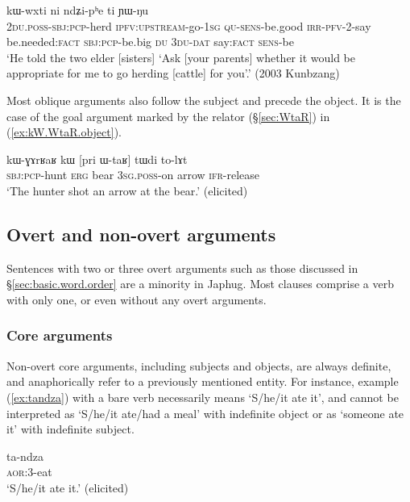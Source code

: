 \begin{exe}
\ex \label{ex:O.ndZiphe}
\gll [nɯ-kɯ-lɤɣ lu-ɕe-a ɯ-ɲɯ́-pe a-tɤ-tɯ-ti ra] kɯ-wxti ni ndʑi-pʰe ti ɲɯ-ŋu\\
\textsc{2du}.\textsc{poss}-\textsc{sbj}:\textsc{pcp}-herd \textsc{ipfv}:\textsc{upstream}-go-\textsc{1sg} \textsc{qu}-\textsc{sens}-be.good \textsc{irr}-\textsc{pfv}-2-say be.needed:\textsc{fact}  \textsc{sbj}:\textsc{pcp}-be.big \textsc{du} \textsc{3du}-\textsc{dat} say:\textsc{fact} \textsc{sens}-be\\
\glt `He told the two elder [sisters] `Ask [your parents] whether it would be appropriate for me to go herding [cattle] for you'.' (2003 Kunbzang)
\end{exe}

Most oblique arguments also follow the subject and precede the object. It is the case of the goal argument marked by the relator  (§\ref{sec:WtaR}) in (\ref{ex:kW.WtaR.object}).

\begin{exe}
\ex \label{ex:kW.WtaR.object}
\gll  kɯ-ɣɤrʁaʁ kɯ [pri ɯ-taʁ] tɯdi to-lɤt \\
\textsc{sbj}:\textsc{pcp}-hunt \textsc{erg} bear \textsc{3sg}.\textsc{poss}-on arrow \textsc{ifr}-release \\
\glt `The hunter shot an arrow at the bear.' (elicited)
\end{exe}

\subsection{Overt and non-overt arguments} \label{sec:overt.non.overt}
Sentences with two or three overt arguments such as those discussed in §\ref{sec:basic.word.order} are a minority in Japhug. Most clauses comprise a verb with only one, or even without any overt arguments.

\subsubsection{Core arguments} \label{sec:nonovert.core.arguments}
Non-overt core arguments, including subjects and objects, are always definite, and anaphorically refer to a previously mentioned entity. For instance, example (\ref{ex:tandza}) with a bare verb necessarily means `S/he/it ate it', and cannot be interpreted as `S/he/it ate/had a meal' with indefinite object or as `someone ate it' with indefinite subject.

\begin{exe}
\ex \label{ex:tandza}
\gll ta-ndza \\
\textsc{aor}:3\flobv{}-eat \\
\glt `S/he/it ate it.' (elicited)
\end{exe}

